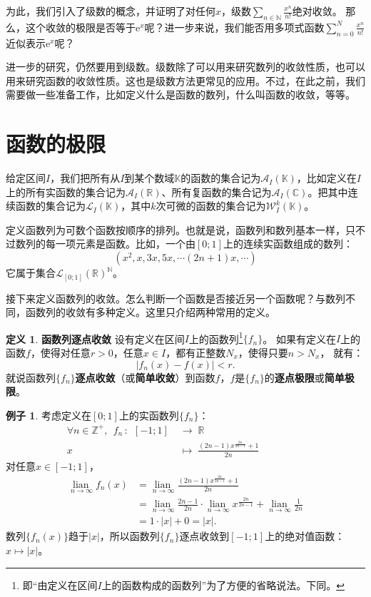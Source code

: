 \documentclass[12pt,UTF8]{ctexbook}
\newcommand{\lian}[1]{
    \underset{#1}{\operatorname{lian}\,}
}
\theoremstyle{definition}
\newtheorem{df}{定义}[section]
\newtheorem{ex}{例子}[section]
\theoremstyle{plain}
\begin{document}
为此，我们引入了级数的概念，并证明了对任何$x$，级数$\sum_{n\in\mathbb{N}}\frac{x^{n}}{n!}$绝对收敛。
那么，这个收敛的极限是否等于$\mathrm{e}^x$呢？进一步来说，我们能否用多项式函数$\sum_{n=0}^N\frac{x^{n}}{n!}$
近似表示$\mathrm{e}^x$呢？

进一步的研究，仍然要用到级数。级数除了可以用来研究数列的收敛性质，也可以用来研究函数的收敛性质。这也是级数方法更常见的应用。不过，在此之前，我们需要做一些准备工作，比如定义什么是函数的数列，什么叫函数的收敛，等等。

\section{函数的极限}

给定区间$I$，我们把所有从$I$到某个数域$\mathbb{K}$的函数的集合记为$\mathcal{A}_I(\mathbb{K})$，比如定义在$I$上的所有实函数的集合记为$\mathcal{A}_I(\mathbb{R})$、所有复函数的集合记为$\mathcal{A}_I(\mathbb{C})$。把其中连续函数的集合记为$\mathcal{L}_I(\mathbb{K})$，其中$k$次可微的函数的集合记为$\mathcal{W}_I^k(\mathbb{K})$。

定义函数列为可数个函数按顺序的排列。也就是说，函数列和数列基本一样，只不过数列的每一项元素是函数。比如，一个由$[0;1]$上的连续实函数组成的数列：
$$ (x^2, x, 3x, 5x, \cdots (2n+1)x, \cdots )$$
它属于集合$\mathcal{L}_{[0;1]}(\mathbb{R})^{\mathbb{N}}$。

接下来定义函数列的收敛。怎么判断一个函数是否接近另一个函数呢？与数列不同，函数列的收敛有多种定义。这里只介绍两种常用的定义。
\begin{df}{\textbf{函数列逐点收敛}}
    设有定义在区间$I$上的函数列\footnote{即“由定义在区间$I$上的函数构成的函数列”为了方便的省略说法。下同。}$\{f_n\}$。
    如果有定义在$I$上的函数$f$，使得对任意$r>0$，任意$x\in I$，都有正整数$N_x$，使得只要$n>N_x$，
    就有：
    $$ |f_n(x) - f(x) | < r.$$
    就说函数列$\{f_n\}$\textbf{逐点收敛}（或\textbf{简单收敛}）到函数$f$，$f$是$\{f_n\}$的\textbf{逐点极限}或\textbf{简单极限}。
\end{df}

\begin{ex}
    考虑定义在$[0;1]$上的实函数列$\{f_n\}$：
    \begin{align*}
        \forall n\in \mathbb{Z}^+, \;\, f_n \,: \,\; [-1;1]\; &\rightarrow \; \mathbb{R} \\
        x \;&\mapsto \; \frac{(2n-1)x^{\frac{2n}{2n-1}} + 1}{2n} \qquad\qquad\phantom{9} 
    \end{align*}
    对任意$x\in [-1;1]$，
    \begin{align*}
        \lian{n\to\infty}f_n(x) &= \lian{n\to\infty} \frac{(2n-1)x^{\frac{2n}{2n-1}} + 1}{2n} \\
        &= \lian{n\to\infty} \frac{2n-1}{2n} \cdot\lian{n\to\infty} x^{\frac{2n}{2n-1}} + \lian{n\to\infty} \frac{1}{2n} \\
        &= 1 \cdot |x| + 0 = |x|. 
    \end{align*}
    数列$\{f_n(x)\}$趋于$|x|$，所以函数列$\{f_n\}$逐点收敛到$[-1;1]$上的绝对值函数：$x\mapsto |x|$。
\end{ex}
\end{document}
